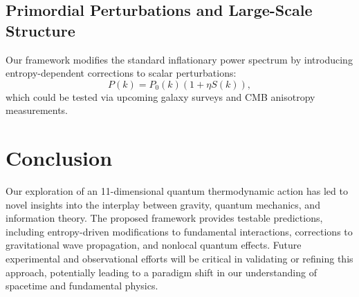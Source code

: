 \documentclass[12pt]{article}
\begin{document}
\subsection{Primordial Perturbations and Large-Scale Structure}
Our framework modifies the standard inflationary power spectrum by introducing entropy-dependent corrections to scalar perturbations:
\begin{equation}
P(k) = P_0(k) \left(1 + \eta S(k)\right),
\end{equation}
which could be tested via upcoming galaxy surveys and CMB anisotropy measurements.

\section{Conclusion}
Our exploration of an 11-dimensional quantum thermodynamic action has led to novel insights into the interplay between gravity, quantum mechanics, and information theory. The proposed framework provides testable predictions, including entropy-driven modifications to fundamental interactions, corrections to gravitational wave propagation, and nonlocal quantum effects. Future experimental and observational efforts will be critical in validating or refining this approach, potentially leading to a paradigm shift in our understanding of spacetime and fundamental physics.



\end{document}
